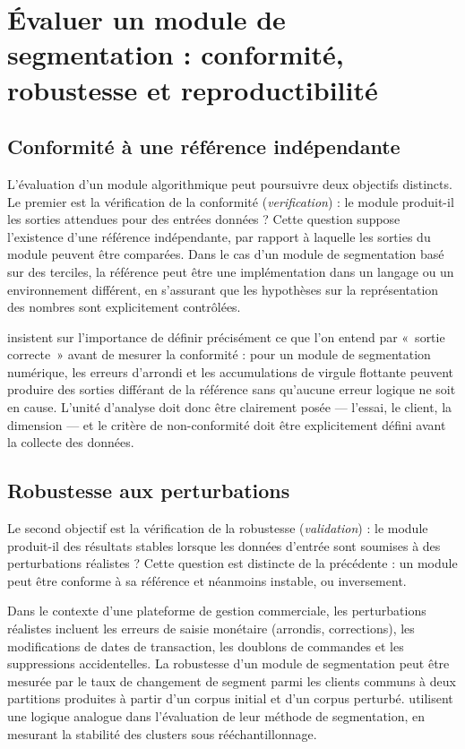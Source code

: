 \section{Évaluer un module de segmentation : conformité, robustesse et reproductibilité}
\label{sec:revue-evaluation}

\subsection{Conformité à une référence indépendante}
\label{subsec:revue-conformite}

L'évaluation d'un module algorithmique peut poursuivre deux objectifs distincts. Le premier
est la vérification de la conformité (\emph{verification}) : le module produit-il les sorties
attendues pour des entrées données ? Cette question suppose l'existence d'une référence
indépendante, par rapport à laquelle les sorties du module peuvent être comparées. Dans le
cas d'un module de segmentation basé sur des terciles, la référence peut être une
implémentation dans un langage ou un environnement différent, en s'assurant que les
hypothèses sur la représentation des nombres sont explicitement contrôlées.

\citet{Salminen2023} insistent sur l'importance de définir précisément ce que l'on entend
par «~sortie correcte~» avant de mesurer la conformité : pour un module de segmentation
numérique, les erreurs d'arrondi et les accumulations de virgule flottante peuvent produire
des sorties différant de la référence sans qu'aucune erreur logique ne soit en cause.
L'unité d'analyse doit donc être clairement posée — l'essai, le client, la dimension — et
le critère de non-conformité doit être explicitement défini avant la collecte des données.

\subsection{Robustesse aux perturbations}
\label{subsec:revue-robustesse}

Le second objectif est la vérification de la robustesse (\emph{validation}) : le module
produit-il des résultats stables lorsque les données d'entrée sont soumises à des
perturbations réalistes ? Cette question est distincte de la précédente : un module peut
être conforme à sa référence et néanmoins instable, ou inversement.

Dans le contexte d'une plateforme de gestion commerciale, les perturbations réalistes
incluent les erreurs de saisie monétaire (arrondis, corrections), les modifications de dates
de transaction, les doublons de commandes et les suppressions accidentelles. La robustesse
d'un module de segmentation peut être mesurée par le taux de changement de segment parmi
les clients communs à deux partitions produites à partir d'un corpus initial et d'un corpus
perturbé. \citet{Rajendran2024} utilisent une logique analogue dans l'évaluation de leur
méthode de segmentation, en mesurant la stabilité des clusters sous rééchantillonnage.

